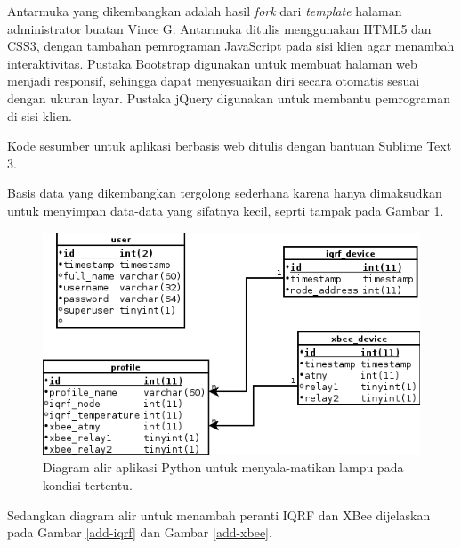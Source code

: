 			Antarmuka yang dikembangkan adalah hasil \emph{fork} dari \emph{template} halaman administrator buatan Vince G. Antarmuka ditulis menggunakan HTML5 dan CSS3, dengan tambahan pemrograman JavaScript pada sisi klien agar menambah interaktivitas. Pustaka Bootstrap digunakan untuk membuat halaman web menjadi responsif, sehingga dapat menyesuaikan diri secara otomatis sesuai dengan ukuran layar. Pustaka jQuery digunakan untuk membantu pemrograman di sisi klien.

			Kode sesumber untuk aplikasi berbasis web ditulis dengan bantuan Sublime Text 3.

			Basis data yang dikembangkan tergolong sederhana karena hanya dimaksudkan untuk menyimpan data-data yang sifatnya kecil, seprti tampak pada Gambar \ref{erd}.

			\begin{figure}[ht!]
			  \centering
			    \includegraphics{gambar/erd}
			    \caption{Diagram alir aplikasi Python untuk menyala-matikan lampu pada kondisi tertentu.}
			    \label{erd}
			\end{figure}

			Sedangkan diagram alir untuk menambah peranti IQRF dan XBee dijelaskan pada Gambar \ref{add-iqrf} dan Gambar \ref{add-xbee}.

